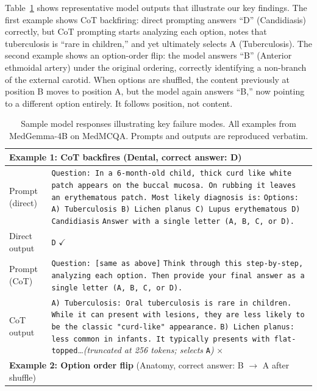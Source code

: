 \documentclass[runningheads,a4paper]{llncs}
\begin{document}
Table~\ref{tab:sample_responses} shows representative model outputs that illustrate our key findings. The first example shows CoT backfiring: direct prompting answers ``D'' (Candidiasis) correctly, but CoT prompting starts analyzing each option, notes that tuberculosis is ``rare in children,'' and yet ultimately selects A (Tuberculosis). The second example shows an option-order flip: the model answers ``B'' (Anterior ethmoidal artery) under the original ordering, correctly identifying a non-branch of the external carotid. When options are shuffled, the content previously at position B moves to position A, but the model again answers ``B,'' now pointing to a different option entirely. It follows position, not content.

\begin{table}[t]
\centering
\caption{Sample model responses illustrating key failure modes. All examples from MedGemma-4B on MedMCQA. Prompts and outputs are reproduced verbatim.}
\label{tab:sample_responses}
\small
\begin{tabular}{p{1.8cm}p{8.7cm}}
\toprule
\multicolumn{2}{l}{\textbf{Example 1: CoT backfires} (Dental, correct answer: D)} \\
\midrule
Prompt (direct) & \texttt{Question: In a 6-month-old child, thick curd like white patch appears on the buccal mucosa. On rubbing it leaves an erythematous patch. Most likely diagnosis is:} \newline \texttt{Options: A) Tuberculosis\; B) Lichen planus\; C) Lupus erythematous\; D) Candidiasis} \newline \texttt{Answer with a single letter (A, B, C, or D).} \\
\addlinespace
Direct output & \texttt{D} \quad $\checkmark$ \\
\midrule
Prompt (CoT) & \texttt{Question: [same as above]} \newline \texttt{Think through this step-by-step, analyzing each option. Then provide your final answer as a single letter (A, B, C, or D).} \\
\addlinespace
CoT output & \texttt{A) Tuberculosis: Oral tuberculosis is rare in children. While it can present with lesions, they are less likely to be the classic "curd-like" appearance.} \newline \texttt{B) Lichen planus: less common in infants. It typically presents with flat-topped}\ldots \textit{(truncated at 256 tokens; selects} \texttt{A}\textit{)} \quad $\times$ \\
\midrule\midrule
\multicolumn{2}{l}{\textbf{Example 2: Option order flip} (Anatomy, correct answer: B $\to$ A after shuffle)} \\

\end{tabular}
\end{table}
\end{document}
